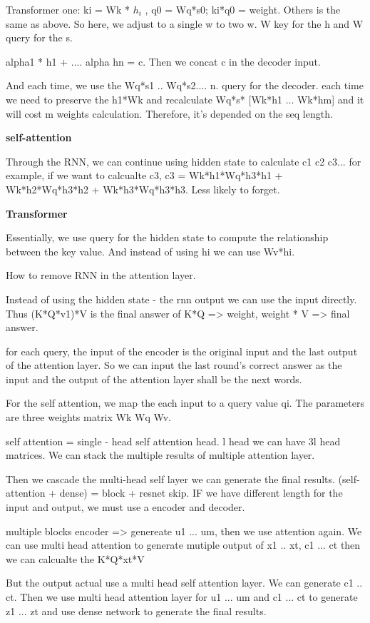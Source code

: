 \documentclass[UTF8]{article}
\begin{document}
Transformer one: ki = Wk * $h_i$ , q0 = Wq*s0;  ki*q0 = weight. Others is the same as above. So here, we adjust to a single w to two w. W key for the h and W query for the s.

alpha1 * h1 + .... alpha hn = c. Then we concat c in the decoder input.

And each time, we use the Wq*s1 .. Wq*s2.... n.  query for the decoder. each time we need to preserve the h1*Wk and recalculate Wq*s* [Wk*h1 ... Wk*hm] and it will cost m weights calculation. Therefore, it's depended on the seq length.

\textbf{self-attention}

Through the RNN, we can continue using hidden state to calculate c1 c2 c3... for example, if we want to calcualte c3, c3 = Wk*h1*Wq*h3*h1 + Wk*h2*Wq*h3*h2 + Wk*h3*Wq*h3*h3. Less likely to forget.

\textbf{Transformer}

Essentially, we use query for the hidden state to compute the relationship between the key value. And instead of using hi we can use Wv*hi.

How to remove RNN in the attention layer.

Instead of using the hidden state - the rnn output we can use the input directly. Thus (K*Q*v1)*V is the final answer of K*Q => weight, weight * V => final answer.

for each query, the input of the encoder is the original input and the last output of the attention layer.  So we can input the last round's correct answer as the input and the output of the attention layer shall be the next words. 

For the self attention, we map the each input to a query value qi.  The parameters are three weights matrix Wk Wq Wv.

self attention = single - head self attention head.  l head we can have 3l head matrices. We can stack the multiple results of multiple attention layer. 

Then we cascade the multi-head self layer we can generate the final results. (self-attention + dense) = block + resnet skip. IF we have different length for the input and output, we must use a encoder and decoder.

multiple blocks encoder => genereate u1 ... um, then we use attention again. We can use multi head attention to generate mutiple output of x1 .. xt, c1 ... ct then we can calcualte the K*Q*xt*V

But the output actual use a multi head self attention layer. We can generate c1 .. ct. Then we use multi head attention layer for u1 ... um and c1 ... ct to generate z1 ... zt and use dense network to generate the final results.
\end{document}
